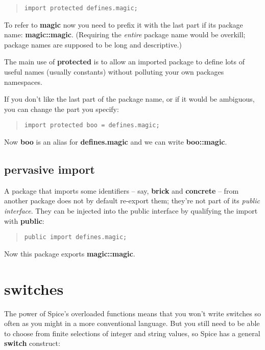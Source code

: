 \documentclass{report}
\begin{document}
\begin{quote}
\begin{verbatim}
import protected defines.magic;
\end{verbatim}
\end{quote}


To refer to {\bf magic} now you need to prefix it with the last part if its
package name: {\bf magic::magic}. (Requiring the {\em entire} package name would be
overkill; package names are supposed to be long and descriptive.)

The main use of {\bf protected} is to allow an imported package to define lots of
useful names (usually constants) without polluting your own packages
namespaces.

If you don't like the last part of the package name, or if it would be
ambiguous, you can change the part you specify:

\begin{quote}
\begin{verbatim}
import protected boo = defines.magic;
\end{verbatim}
\end{quote}


Now {\bf boo} is an alias for {\bf defines.magic} and we can write {\bf boo::magic}.

\section{pervasive import}


A package that imports some identifiers -- say, {\bf brick} and {\bf concrete} -- from
another package does not by default re-export them; they're not part of its
{\em public interface}. They can be injected into the public interface by
qualifying the import with {\bf public}:

\begin{quote}
\begin{verbatim}
public import defines.magic;
\end{verbatim}
\end{quote}


Now this package exports {\bf magic::magic}.\chapter{switches}


The power of Spice's overloaded functions means that you won't write switches
so often as you might in a more conventional language. But you still need to
be able to choose from finite selections of integer and string values, so
Spice has a general {\bf switch} construct:
\end{document}

